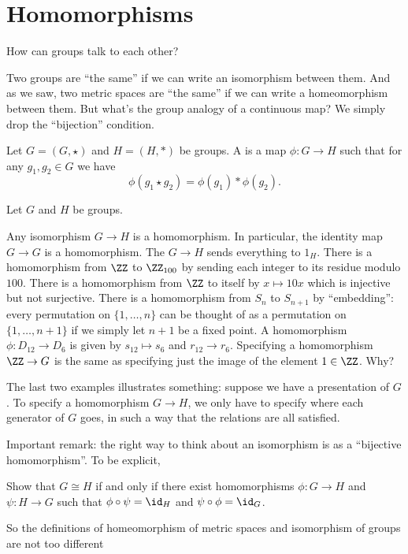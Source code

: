 \section{Homomorphisms}

How can groups talk to each other?

Two groups are ``the same'' if we can write an isomorphism between them.
And as we saw, two metric spaces are ``the same''
if we can write a homeomorphism between them.
But what's the group analogy of a continuous map?
We simply drop the ``bijection'' condition.

\begin{definition}
	Let $G = (G, \star)$ and $H = (H, \ast)$ be groups.
	A  is a map $\phi : G \to H$
	such that for any $g_1, g_2 \in G$ we have
	\[ \phi(g_1 \star g_2) = \phi(g_1) \ast \phi(g_2). \]
\end{definition}

\begin{example}
	Let $G$ and $H$ be groups.
	\begin{enumerate}[(a)]
		\ii Any isomorphism $G \to H$ is a homomorphism.
		In particular, the identity map $G \to G$ is a homomorphism.
		\ii The  $G \to H$ sends
		everything to $1_H$.
		\ii There is a homomorphism from $\ZZ$ to $\Zc{100}$ by
		sending each integer to its residue modulo $100$.
		\ii There is a homomorphism from $\ZZ$ to itself by $x \mapsto 10x$
		which is injective but not surjective.
		\ii There is a homomorphism from $S_n$ to $S_{n+1}$ by ``embedding'':
		every permutation on $\{1,\dots,n\}$ can be thought of as a permutation
		on $\{1,\dots,n+1\}$ if we simply let $n+1$ be a fixed point.
		\ii A homomorphism $\phi: D_{12} \to D_6$ is given by $s_{12} \mapsto s_6$ and $r_{12} \to r_6$.  
		\ii Specifying a homomorphism $\ZZ \to G$ is the same as
		specifying just the image of the element $1 \in \ZZ$. Why?
	\end{enumerate}
\end{example}
The last two examples illustrates something: suppose we have a presentation of $G$.
To specify a homomorphism $G \to H$, we only have to specify where each generator of $G$ goes, in such a way that the relations are all satisfied.

Important remark:
the right way to think about an isomorphism is as a ``bijective homomorphism''.
To be explicit,
\begin{exercise}
	Show that $G \cong H$ if and only if there exist
	homomorphisms $\phi : G \to H$ and $\psi : H \to G$
	such that $\phi \circ \psi = \id_H$ and $\psi \circ \phi = \id_G$.
\end{exercise}
So the definitions of homeomorphism of metric spaces
and isomorphism of groups are not too different

